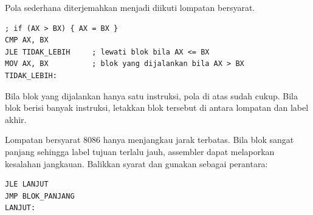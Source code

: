 Pola  sederhana diterjemahkan menjadi  diikuti
lompatan bersyarat.

\begin{lstlisting}[language=MASM, numbers=none]
; if (AX > BX) { AX = BX }
CMP AX, BX
JLE TIDAK_LEBIH     ; lewati blok bila AX <= BX
MOV AX, BX          ; blok yang dijalankan bila AX > BX
TIDAK_LEBIH:
\end{lstlisting}

Bila blok yang dijalankan hanya satu instruksi, pola di atas sudah
cukup. Bila blok berisi banyak instruksi, letakkan blok tersebut di
antara lompatan dan label akhir.

\begin{infobox}
\vspace{1.1em}
Lompatan bersyarat 8086 hanya menjangkau jarak terbatas. Bila blok
 sangat panjang sehingga label tujuan terlalu jauh,
assembler dapat melaporkan kesalahan jangkauan. Balikkan syarat dan
gunakan  sebagai perantara:

\begin{lstlisting}[language=MASM, numbers=none]
JLE LANJUT
JMP BLOK_PANJANG
LANJUT:
\end{lstlisting}
\end{infobox}
